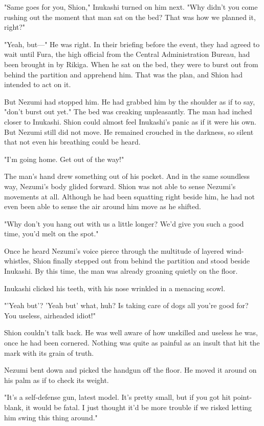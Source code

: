 "Same goes for you, Shion," Inukashi turned on him next. "Why didn't you
come rushing out the moment that man sat on the bed? That was how we
planned it, right?"

"Yeah, but---" He was right. In their briefing before the event, they had
agreed to wait until Fura, the high official from the Central
Administration Bureau, had been brought in by Rikiga. When he sat on the
bed, they were to burst out from behind the partition and apprehend him.
That was the plan, and Shion had intended to act on it.

But Nezumi had stopped him. He had grabbed him by the shoulder as if to
say, "don't burst out yet." The bed was creaking unpleasantly. The man
had inched closer to Inukashi. Shion could almost feel Inukashi's panic
as if it were his own. But Nezumi still did not move. He remained
crouched in the darkness, so silent that not even his breathing could be
heard.

"I'm going home. Get out of the way!"

The man's hand drew something out of his pocket. And in the same
soundless way, Nezumi's body glided forward. Shion was not able to sense
Nezumi's movements at all. Although he had been squatting right beside
him, he had not even been able to sense the air around him move as he
shifted.

"Why don't you hang out with us a little longer? We'd give you such a
good time, you'd melt on the spot."

Once he heard Nezumi's voice pierce through the multitude of layered
wind-whistles, Shion finally stepped out from behind the partition and
stood beside Inukashi. By this time, the man was already groaning
quietly on the floor.

Inukashi clicked his teeth, with his nose wrinkled in a menacing scowl.

"'Yeah but'? 'Yeah but' what, huh? Is taking care of dogs all you're
good for? You useless, airheaded idiot!"

Shion couldn't talk back. He was well aware of how unskilled and useless
he was, once he had been cornered. Nothing was quite as painful as an
insult that hit the mark with its grain of truth.

Nezumi bent down and picked the handgun off the floor. He moved it
around on his palm as if to check its weight.

"It's a self-defense gun, latest model. It's pretty small, but if you
got hit point-blank, it would be fatal. I just thought it'd be more
trouble if we risked letting him swing this thing around."

